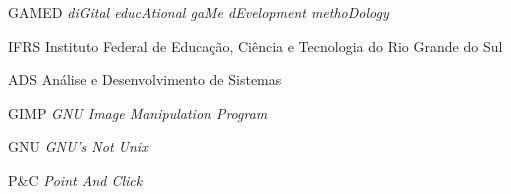 \begin{siglas}
  \item[GAMED] \emph{diGital educAtional gaMe dEvelopment methoDology}
  \item[IFRS] Instituto Federal de Educação, Ciência e Tecnologia do Rio Grande do Sul
  \item[ADS] Análise e Desenvolvimento de Sistemas
  \item[GIMP] \emph{GNU Image Manipulation Program}
  \item[GNU] \emph{GNU's Not Unix}
  \item[P\&C] \emph{Point And Click}
\end{siglas}
